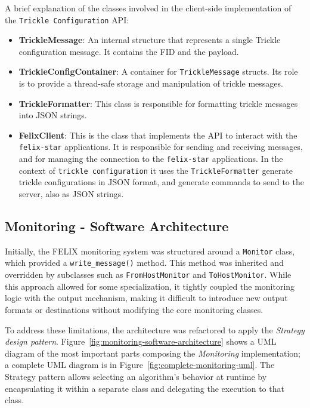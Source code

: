 A brief explanation of the classes involved in the client-side implementation of the \texttt{Trickle Configuration} \acs{API}:

\begin{itemize}
    \item \textbf{TrickleMessage}: An internal structure that represents a single Trickle configuration message. It contains the \acs{FID} and the payload.
    
    \item \textbf{TrickleConfigContainer}: A container for \texttt{TrickleMessage} structs. Its role is to provide a thread-safe storage and manipulation of trickle messages.
    
    \item \textbf{TrickleFormatter}: This class is responsible for formatting trickle messages into JSON strings.
    
    \item \textbf{FelixClient}: This is the class that implements the \acs{API} to interact with the \texttt{felix-star} applications. It is responsible for sending and receiving messages, and for managing the connection to the \texttt{felix-star} applications. In the context of \texttt{trickle configuration} it uses the \texttt{TrickleFormatter} generate trickle configurations in JSON format, and generate commands to send to the server, also as JSON strings.
\end{itemize}


\subsection{Monitoring - Software Architecture}

Initially, the \acs{FELIX} monitoring system was structured around a \texttt{Monitor} class, which provided a \texttt{write\_message()} method. This method was inherited and overridden by subclasses such as \texttt{FromHostMonitor} and \texttt{ToHostMonitor}. While this approach allowed for some specialization, it tightly coupled the monitoring logic with the output mechanism, making it difficult to introduce new output formats or destinations without modifying the core monitoring classes.

To address these limitations, the architecture was refactored to apply the \textit{Strategy design pattern}. Figure~\ref{fig:monitoring-software-architecture} shows a UML diagram of the most important parts composing the \textit{Monitoring} implementation; a complete UML diagram is in Figure~\ref{fig:complete-monitoring-uml}. The Strategy pattern allows selecting an algorithm's behavior at runtime by encapsulating it within a separate class and delegating the execution to that class.

